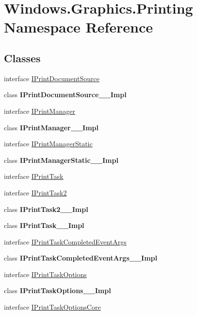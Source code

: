 \hypertarget{namespace_windows_1_1_graphics_1_1_printing}{}\section{Windows.\+Graphics.\+Printing Namespace Reference}
\label{namespace_windows_1_1_graphics_1_1_printing}
\subsection*{Classes}
\begin{DoxyCompactItemize}
\item 
interface \hyperlink{interface_windows_1_1_graphics_1_1_printing_1_1_i_print_document_source}{I\+Print\+Document\+Source}
\item 
class {\bfseries I\+Print\+Document\+Source\+\_\+\+\_\+\+Impl}
\item 
interface \hyperlink{interface_windows_1_1_graphics_1_1_printing_1_1_i_print_manager}{I\+Print\+Manager}
\item 
class {\bfseries I\+Print\+Manager\+\_\+\+\_\+\+Impl}
\item 
interface \hyperlink{interface_windows_1_1_graphics_1_1_printing_1_1_i_print_manager_static}{I\+Print\+Manager\+Static}
\item 
class {\bfseries I\+Print\+Manager\+Static\+\_\+\+\_\+\+Impl}
\item 
interface \hyperlink{interface_windows_1_1_graphics_1_1_printing_1_1_i_print_task}{I\+Print\+Task}
\item 
interface \hyperlink{interface_windows_1_1_graphics_1_1_printing_1_1_i_print_task2}{I\+Print\+Task2}
\item 
class {\bfseries I\+Print\+Task2\+\_\+\+\_\+\+Impl}
\item 
class {\bfseries I\+Print\+Task\+\_\+\+\_\+\+Impl}
\item 
interface \hyperlink{interface_windows_1_1_graphics_1_1_printing_1_1_i_print_task_completed_event_args}{I\+Print\+Task\+Completed\+Event\+Args}
\item 
class {\bfseries I\+Print\+Task\+Completed\+Event\+Args\+\_\+\+\_\+\+Impl}
\item 
interface \hyperlink{interface_windows_1_1_graphics_1_1_printing_1_1_i_print_task_options}{I\+Print\+Task\+Options}
\item 
class {\bfseries I\+Print\+Task\+Options\+\_\+\+\_\+\+Impl}
\item 
interface \hyperlink{interface_windows_1_1_graphics_1_1_printing_1_1_i_print_task_options_core}{I\+Print\+Task\+Options\+Core}

\end{DoxyCompactItemize}
